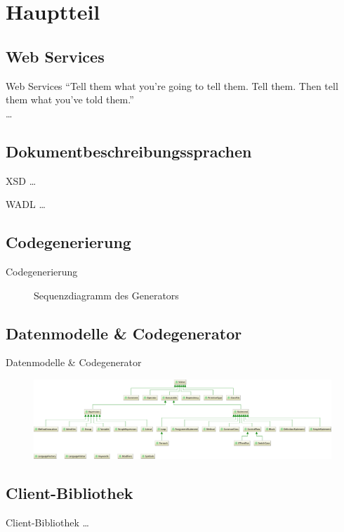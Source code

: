 \section{Hauptteil}

\subsection{Web Services}
\begin{frame}{Web Services}
    \enquote{Tell them what you’re going to tell them. Tell them. Then tell them what you’ve told them.}\\
    \ldots
\end{frame}

\subsection{Dokumentbeschreibungssprachen}
\begin{frame}{XSD}
	\ldots
\end{frame}

\begin{frame}{WADL}
    \ldots
\end{frame}

\subsection{Codegenerierung}
\begin{frame}{Codegenerierung}
    \begin{figure}
        \resizebox{\textwidth}{!}{
            
        }
        \caption{Sequenzdiagramm des Generators}
    \end{figure}
\end{frame}

\subsection{Datenmodelle \& Codegenerator}
\begin{frame}{Datenmodelle \& Codegenerator}
	\begin{figure}
        \includegraphics[width=\textwidth]{resources/languagemodel}
    \end{figure}
\end{frame}

\subsection{Client-Bibliothek}
\begin{frame}{Client-Bibliothek}
	\ldots
\end{frame}
